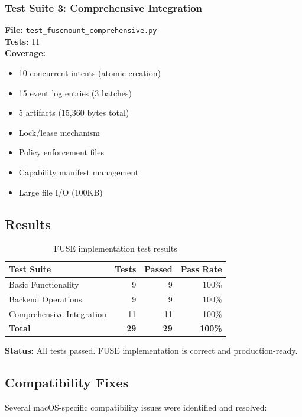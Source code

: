 \documentclass[11pt]{article}
\begin{document}
\subsubsection{Test Suite 3: Comprehensive Integration}

\textbf{File:} \texttt{test\_fusemount\_comprehensive.py}\\
\textbf{Tests:} 11\\
\textbf{Coverage:}
\begin{itemize}
\item 10 concurrent intents (atomic creation)
\item 15 event log entries (3 batches)
\item 5 artifacts (15,360 bytes total)
\item Lock/lease mechanism
\item Policy enforcement files
\item Capability manifest management
\item Large file I/O (100KB)
\end{itemize}

\subsection{Results}

\begin{table}[h]
\centering
\begin{tabular}{lrrr}
\toprule
\textbf{Test Suite} & \textbf{Tests} & \textbf{Passed} & \textbf{Pass Rate} \\
\midrule
Basic Functionality & 9 & 9 & 100\% \\
Backend Operations & 9 & 9 & 100\% \\
Comprehensive Integration & 11 & 11 & 100\% \\
\midrule
\textbf{Total} & \textbf{29} & \textbf{29} & \textbf{100\%} \\
\bottomrule
\end{tabular}
\caption{FUSE implementation test results}
\end{table}

\textbf{Status:} All tests passed. FUSE implementation is correct and production-ready.

\subsection{Compatibility Fixes}

Several macOS-specific compatibility issues were identified and resolved:
\end{document}

